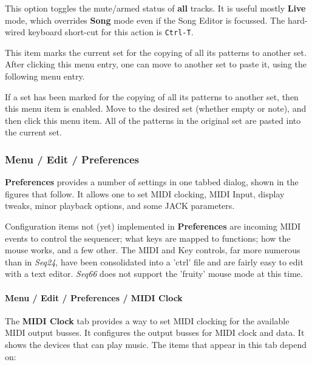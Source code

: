    This option toggles the mute/armed status of \textbf{all} tracks.
   It is useful mostly \textbf{Live} mode, which overrides \textbf{Song}
   mode even if the Song Editor is focussed.
   The hard-wired keyboard short-cut for this action is \texttt{Ctrl-T}.

   This item marks the current set for the copying of all its patterns to
   another set.
   After clicking this menu entry, one can move to another set to paste it,
   using the following menu entry.

   If a set has been marked for the copying of all its patterns to
   another set, then this menu item is enabled.
   Move to the desired set (whether empty or note), and then
   click this menu item.
   All of the patterns in the original set are pasted into the current set.

\subsubsection{Menu / Edit / Preferences}
\label{subsubsec:menu_edit_preferences}

   \textbf{Preferences} provides a number of settings in one
   tabbed dialog, shown in the figures that follow.
   It allows one to set MIDI clocking, MIDI Input, display tweaks, minor
   playback options, and some JACK parameters.

  Configuration items not (yet) implemented in \textbf{Preferences} are
      incoming MIDI events to control the sequencer;
      what keys are mapped to functions;
      how the mouse works, and a few other.
   The MIDI and Key controls, far more numerous than in \textsl{Seq24}, have
   been consolidated into a 'ctrl' file and are fairly easy to edit with a text
   editor.
   \textsl{Seq66} does not support the 'fruity' mouse mode at this time.

\paragraph{Menu / Edit / Preferences / MIDI Clock}
\label{paragraph:menu_edit_preferences_midi_clock}

   The \textbf{MIDI Clock} tab provides a way to set MIDI clocking for
   the available MIDI output busses.
   It configures the output busses for MIDI clock and data.
   It shows the devices that can play music.
   The items that appear in this tab depend on:

